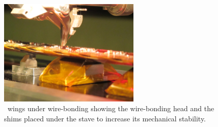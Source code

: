 
\begin{figure}
	\centering
        \includegraphics[width=0.6\textwidth]{Images/ibl_stave_loading/WingGluing/IMG_3091.JPG}
        \caption{\upcase \staveflex\ wings under wire-bonding showing the wire-bonding head and the shims placed under the stave to increase its mechanical stability.}
        \label{fig:shimforwire-bonding}
\end{figure}



